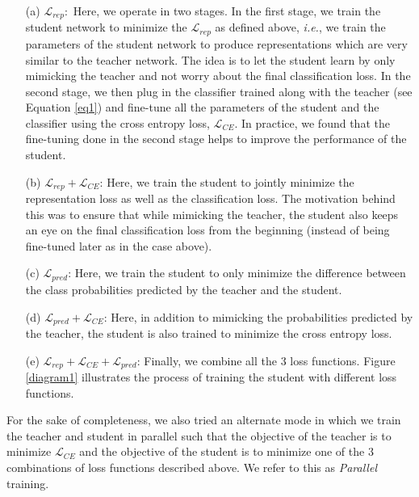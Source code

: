\documentclass[10pt,twocolumn,letterpaper]{article}
\begin{document}
\begin{enumerate}
\item[(a)] $\mathcal{L}_{rep}:$ Here, we operate in two stages. In the first stage, we train the student network to minimize the $\mathcal{L}_{rep}$ as defined above, \textit{i.e.}, we train the parameters of the student network to produce representations which are very similar to the teacher network. The idea is to let the student learn by only mimicking the teacher and not worry about the final classification loss. In the second stage, we then plug in the classifier trained along with the teacher (see Equation \ref{eq1}) and fine-tune all the parameters of the student and the classifier using the cross entropy loss, $\mathcal{L}_{CE}$. In practice, we found that the fine-tuning done in the second stage helps to improve the performance of the student. 

\item[(b)] $\mathcal{L}_{rep} + \mathcal{L}_{CE}$: Here, we train the student to jointly minimize the representation loss as well as the classification loss. The motivation behind this was to ensure that while mimicking the teacher, the student also keeps an eye on the final classification loss from the beginning (instead of being fine-tuned later as in the case above). \item[(c)] $\mathcal{L}_{pred}$: Here, we train the student to only minimize the difference between the class probabilities predicted by the teacher and the student. 

\item[(d)] $\mathcal{L}_{pred} + \mathcal{L}_{CE}$: Here, in addition to mimicking the probabilities predicted by the teacher, the student is also trained to minimize the cross entropy loss.

\item[(e)] $\mathcal{L}_{rep} + \mathcal{L}_{CE} + \mathcal{L}_{pred}$: Finally, we combine all the 3 loss functions. Figure \ref{diagram1} illustrates the process of training the student with different loss functions. \end{enumerate}

For the sake of completeness, we also tried an alternate mode in which we train the teacher and student in parallel such that the objective of the teacher is to minimize $\mathcal{L}_{CE}$ and the objective of the student is to minimize one of the $3$ combinations of loss functions described above. We refer to this as \textit{Parallel} training.
\end{document}
